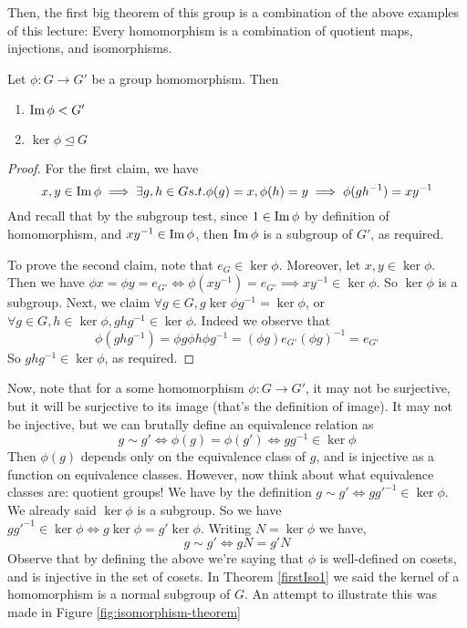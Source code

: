 Then, the first big theorem of this group is a combination of the above examples of this
lecture: Every homomorphism is a combination of quotient maps, injections, and
isomorphisms.
\begin{theorem} 
  Let $\phi:G\to G'$ be a group homomorphism. Then 
  \begin{enumerate}
    \item $\operatorname{Im}\phi < G'$
    \item $\ker\phi \trianglelefteq G$
  \end{enumerate}
  \label{firstIso1}
\end{theorem}
\begin{proof}
  For the first claim, we have
  \[x,y\in\operatorname{Im}\phi \implies \exists g,h\in G s.t. \phi(g)=x,\phi(h)=y \implies
  \phi(gh^{-1})=xy^{-1}\]
  And recall that by the subgroup test, since $1\in\operatorname{Im}\phi$ by definition of
  homomorphism, and $xy^{-1}\in\operatorname{Im}\phi$, then $\operatorname{Im}\phi$ is a subgroup of $G'$, as
  required.

  To prove the second claim, note that $e_G\in\ker\phi$. Moreover, let $x,y\in\ker\phi$.
  Then we have $\phi x = \phi y =e_{G'}\iff \phi (xy^{-1}) = e_{G'} \implies
  xy^{-1}\in\ker\phi$. So $\ker\phi$ is a subgroup. Next, we claim $\forall g\in G,
  g\ker\phi g^{-1}= \ker\phi$, or $\forall g\in G, h\in\ker\phi,ghg^{-1}\in\ker\phi$.
  Indeed we observe that 
  \[\phi(ghg^{-1})= \phi g\phi h \phi g^{-1} = (\phi g)e_{G'} (\phi g)^{-1} = e_{G'}\]
  So $ghg^{-1}\in\ker\phi$, as required.
\end{proof}

Now, note that for a some homomorphism $\phi:G\to G'$, it may not be surjective, but it
will be surjective to its image (that's the definition of image). It may not be injective,
but we can brutally define an equivalence relation as 
\[g\sim g' \iff \phi(g)=\phi(g')\iff gg^{-1}\in \ker\phi\]
Then $\phi(g)$ depends only on the equivalence class of $g$, and is injective as a
function on equivalence classes. However, now think about what equivalence classes are:
quotient groups! We have by the definition $g\sim g' \iff gg'^{-1}\in \ker\phi$. We already
said $\ker\phi$ is a subgroup. So we have $gg'^{-1}\in \ker\phi \iff
g\ker\phi=g'\ker\phi$. Writing $N=\ker\phi$ we have,
\[g\sim g' \iff gN = g'N\]
Observe that by defining the above we're saying that $\phi$ is well-defined on cosets, and
is injective in the set of cosets. In Theorem \ref{firstIso1} we said the kernel of a
homomorphism is a normal subgroup of $G$. An attempt to illustrate this was made in Figure
\ref{fig:isomorphism-theorem}

